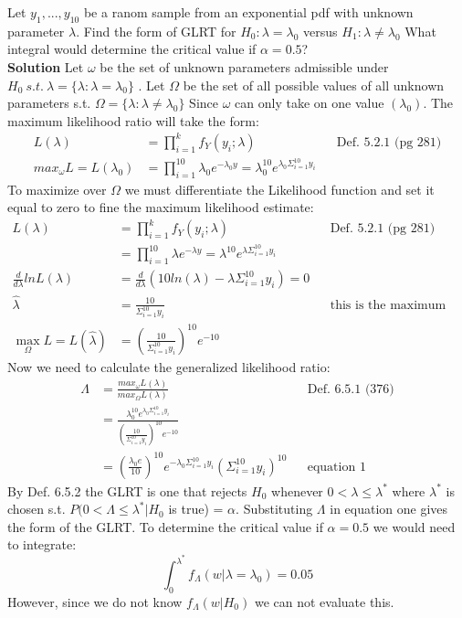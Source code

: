 \documentclass[12pt]{article}
\newenvironment{problem}[2][Problem]{\begin{trivlist}
\item[\hskip \labelsep {\bfseries #1}\hskip \labelsep {\bfseries #2.}]}{\end{trivlist}}
\begin{document}
\begin{problem}{6.5.2}  Let $y_1,...,y_10$ be a ranom sample from an exponential pdf with unknown parameter $\lambda $. Find the form of GLRT for $H_0: \lambda = \lambda_0$ versus $H_1:\lambda \neq \lambda_0$ What integral would  determine the critical value if $\alpha = 0.5$?\\

\textbf{Solution} Let $\omega $ be the set of unknown parameters admissible under $H_0 \ s.t. \ \lambda = \{\lambda : \lambda = \lambda_0 \} $ . Let $\Omega $ be the set of all possible values of all unknown parameters s.t. $\Omega = \{\lambda : \lambda \neq \lambda_0 \} $ Since $\omega $ can only take on one value $(\lambda_0)$. The maximum likelihood ratio will take the form: 
\begin{align*}
	L(\lambda ) &= \prod_{i=1}^{k} f_Y(y_i;\lambda ) && \text{Def. 5.2.1 (pg 281)} \\ 
	max_{\omega} L = L(\lambda_0)&=  \prod_{i=1}^{10}\lambda_0 e^{-\lambda_0 y} = \lambda_0^{10}e^{\lambda_0 \Sigma_{i=1}^{10}y_i} 
\end{align*}
To maximize over $\Omega $ we must differentiate the Likelihood function and set it equal to zero to fine the maximum likelihood estimate: 
\begin{align*}
	L(\lambda ) &= \prod_{i=1}^{k} f_Y(y_i;\lambda ) && \text{Def. 5.2.1 (pg 281)} \\ 
		&=  \prod_{i=1}^{10}\lambda e^{-\lambda y} = \lambda^{10}e^{\lambda \Sigma_{i=1}^{10}y_i} \\ 
	\frac{d}{d\lambda }ln L(\lambda )&=\frac{d}{d\lambda }( 10ln(\lambda) - \lambda \Sigma_{i=1}^{10}y_i) = 0\\
		 \hat{\lambda} &= \frac{10}{ \Sigma_{i=1}^{10}y_i} &&\text{this is the maximum likelihood estimate} \\
\max_{\Omega} L = L(\hat{\lambda})& = (\frac{10}{ \Sigma_{i=1}^{10}y_i})^{10}e^{-10}
\end{align*}
Now we need to calculate the generalized likelihood ratio: 
\begin{align*}
	\Lambda &= \frac{max_{\omega}L(\lambda)}{max_{\Omega}L(\lambda)} && \text{Def. 6.5.1 (376)} \\
		&= \frac{\lambda_0^{10}e^{\lambda_0 \Sigma_{i=1}^{10}y_i} }{ (\frac{10}{ \Sigma_{i=1}^{10}y_i})^{10}e^{-10}} \\ 
&= (\frac{\lambda_0 e}{10})^{10}e^{-\lambda_0\Sigma_{i=1}^{10}y_i}(\Sigma_{i=1}^{10}y_i)^{10}  && \text{equation 1}
\end{align*}
By Def. 6.5.2 the GLRT is one that rejects $H_0$ whenever $0 < \lambda \leq \lambda^*$ where $\lambda^*$ is chosen s.t. $P(0<\Lambda \leq \lambda^* | H_0$ is true) = $\alpha $. Substituting $\Lambda$ in equation one gives the form of the GLRT. To determine the critical value if $\alpha = 0.5$ we would need to integrate: 
$$ \int_0^{\lambda^*}f_{\Lambda}(w|\lambda = \lambda_0) = 0.05  $$ However, since we do not know $f_{\Lambda}(w|H_0)$ we can not evaluate this. 
\end{problem}
\end{document}
